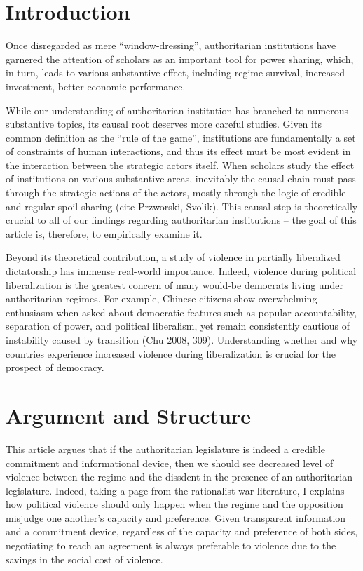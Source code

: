 \documentclass[12pt]{article}
\begin{document}
\section{Introduction}

Once disregarded as mere ``window-dressing'', authoritarian institutions have garnered the attention of scholars as an important tool for power sharing, which, in turn, leads to various substantive effect, including regime survival, increased investment, better economic performance.

While our understanding of authoritarian institution has branched to numerous substantive topics, its causal root deserves more careful studies. Given its common definition as the ``rule of the game'', institutions are fundamentally a set of constraints of human interactions, and thus its effect must be most evident in the interaction between the strategic actors itself.  When scholars study the effect of institutions on various substantive areas, inevitably the causal chain must pass through the strategic actions of the actors, mostly through the logic of credible and regular spoil sharing (cite Przworski, Svolik). This causal step is theoretically crucial to all of our findings regarding authoritarian institutions – the goal of this article is, therefore, to empirically examine it.

Beyond its theoretical contribution, a study of violence in partially liberalized dictatorship has immense real-world importance. Indeed, violence during political liberalization is the greatest concern of many would-be democrats living under authoritarian regimes. For example, Chinese citizens show overwhelming enthusiasm when asked about democratic features such as popular accountability, separation of power, and political liberalism, yet remain consistently cautious of instability caused by transition (Chu 2008, 309). Understanding whether and why countries experience increased violence during liberalization is crucial for the prospect of democracy.

\section{Argument and Structure}

This article argues that if the authoritarian legislature is indeed a credible commitment and informational device, then we should see decreased level of violence between the regime and the dissdent in the presence of an authoritarian legislature. Indeed, taking a page from the rationalist war literature, I explains how political violence should only happen when the regime and the opposition misjudge one another's capacity and preference. Given transparent information and a commitment device, regardless of the capacity and preference of both sides, negotiating to reach an agreement is always preferable to violence due to the savings in the social cost of violence.
\end{document}
